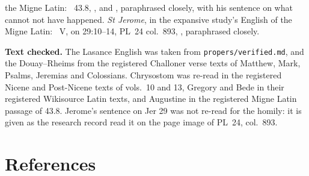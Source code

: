 {the Migne Latin: ~43.8, ,  and , paraphrased closely, with his sentence on what
cannot not have happened. \emph{St Jerome}, in the expansive study's English
of the Migne Latin: ~V, on 29:10--14, PL~24 col.~893,
, paraphrased closely.

\textbf{Text checked.} The Lasance English was taken from
\texttt{propers/verified.md}, and the Douay--Rheims from the registered
Challoner verse texts of Matthew, Mark, Psalms, Jeremias and Colossians.
Chrysostom was re-read in the registered Nicene and Post-Nicene texts of
vols.~10 and 13, Gregory and Bede in their registered Wikisource Latin texts,
and Augustine in the registered Migne Latin passage of 43.8. Jerome's
sentence on Jer 29 was not re-read for the homily: it is given as the
research record read it on the page image of PL~24, col.~893.

\par}

\section*{References}

